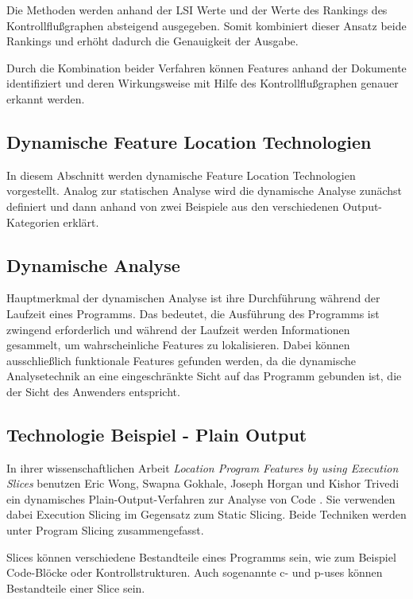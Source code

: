\documentclass[runningheads,a4paper]{llncs}
\begin{document}
Die Methoden werden anhand der \ac{LSI} Werte und der Werte des Rankings des Kontrollflußgraphen absteigend ausgegeben. Somit kombiniert dieser Ansatz beide Rankings und erhöht dadurch die Genauigkeit der Ausgabe.

Durch die Kombination beider Verfahren können Features anhand der Dokumente identifiziert und deren Wirkungsweise mit Hilfe des Kontrollflußgraphen genauer erkannt werden.

\subsection{Dynamische Feature Location Technologien}

In diesem Abschnitt werden dynamische Feature Location Technologien vorgestellt. Analog zur statischen Analyse wird die dynamische Analyse zunächst definiert und dann anhand von zwei Beispiele aus den verschiedenen Output-Kategorien erklärt.

\subsection*{Dynamische Analyse}\label{dynamic}

Hauptmerkmal der dynamischen Analyse ist ihre Durchführung während der Laufzeit eines Programms. Das bedeutet, die Ausführung des Programms ist zwingend erforderlich und während der Laufzeit werden Informationen gesammelt, um wahrscheinliche Features zu lokalisieren. Dabei können ausschließlich funktionale Features gefunden werden, da die dynamische Analysetechnik an eine eingeschränkte Sicht auf das Programm gebunden ist, die der Sicht des Anwenders entspricht. 

\subsection*{Technologie Beispiel - Plain Output}

In ihrer wissenschaftlichen Arbeit \textit{Location Program Features by using Execution Slices} benutzen Eric Wong, Swapna Gokhale, Joseph Horgan und Kishor Trivedi ein dynamisches Plain-Output-Verfahren zur Analyse von Code \cite{Executionslices}. Sie verwenden dabei Execution Slicing im Gegensatz zum Static Slicing. Beide Techniken werden unter Program Slicing zusammengefasst.

Slices können verschiedene Bestandteile eines Programms sein, wie zum Beispiel Code-Blöcke oder Kontrollstrukturen. Auch sogenannte c- und p-uses können Bestandteile einer Slice sein.
\end{document}
